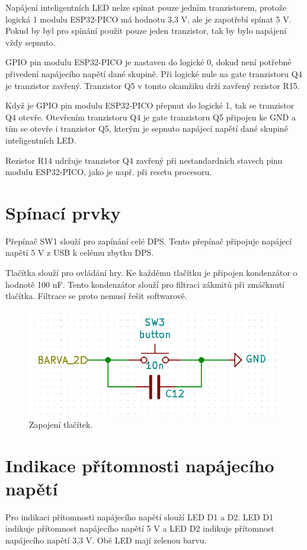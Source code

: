   Napájení inteligentních LED nelze spínat pouze jedním tranzistorem, protože logická 1 modulu ESP32-PICO má hodnotu 3,3 V, ale je 
  zapotřebí spínat 5 V. Pokud by byl pro spínání použit pouze jeden tranzistor, tak by bylo napájení vždy sepnuto.

  GPIO pin modulu ESP32-PICO je nastaven do logické 0, dokud není potřebné přivedení napájecího napětí dané skupině. 
  Při logické nule na gate 
  tranzistoru Q4 je tranzistor zavřený. Tranzistor Q5 v tomto okamžiku drží zavřený rezistor R15.

  Když je GPIO pin modulu ESP32-PICO přepnut do logické 1, tak se tranzistor Q4 otevře. Otevřením tranzistoru Q4 je gate tranzistoru Q5 
  připojen ke GND a tím se otevře i tranzistor Q5, kterým je sepnuto napájecí napětí dané skupině inteligentních LED.

  Rezistor R14 udržuje tranzistor Q4 zavřený při nestandardních stavech pinu modulu ESP32-PICO, jako je např. při resetu procesoru.

  \section{Spínací prvky}
  Přepínač SW1 slouží pro zapínání celé DPS. Tento přepínač připojuje napájecí napětí 5 V z USB k celému zbytku DPS.

  Tlačítka slouží pro ovládání hry. Ke každému tlačítku je připojen kondenzátor o hodnotě 100 nF. Tento kondenzátor 
  slouží pro filtraci zákmitů při zmáčknutí tlačítka. Filtrace se proto nemusí řešit softwarově.

  \begin{figure}[!h]
    \begin{center}
      \includegraphics[scale=0.8]{obrazky/Tlacitka_zapojeni.png}
    \end{center}
    \caption[Zapojení tlačítek]{Zapojení tlačítek.}
  \end{figure}

  \section{Indikace přítomnosti napájecího napětí}
  Pro indikaci přítomnosti napájecího napětí slouží LED D1 a D2.  LED D1 indikuje přítomnost napájecího napětí 
  5 V a LED D2 indikuje přítomnost napájecího napětí 3,3 V. Obě LED mají zelenou barvu.

